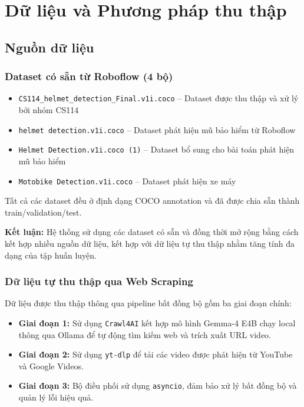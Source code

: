 \section{Dữ liệu và Phương pháp thu thập}
\subsection{Nguồn dữ liệu}
\subsubsection{Dataset có sẵn từ Roboflow (4 bộ)}

\begin{itemize}
    \item \texttt{CS114\_helmet\_detection\_Final.v1i.coco} – Dataset được thu thập và xử lý bởi nhóm CS114
    \item \texttt{helmet detection.v1i.coco} – Dataset phát hiện mũ bảo hiểm từ Roboflow
    \item \texttt{Helmet Detection.v1i.coco (1)} – Dataset bổ sung cho bài toán phát hiện mũ bảo hiểm
    \item \texttt{Motobike Detection.v1i.coco} – Dataset phát hiện xe máy
\end{itemize}

Tất cả các dataset đều ở định dạng COCO annotation và đã được chia sẵn thành train/validation/test.

\textbf{Kết luận:} Hệ thống sử dụng các dataset có sẵn và đồng thời mở rộng bằng cách kết hợp nhiều nguồn dữ liệu, kết hợp với dữ liệu tự thu thập nhằm tăng tính đa dạng của tập huấn luyện.

\subsubsection{Dữ liệu tự thu thập qua Web Scraping}

Dữ liệu được thu thập thông qua pipeline bất đồng bộ gồm ba giai đoạn chính:

\begin{itemize}
    \item \textbf{Giai đoạn 1:} Sử dụng \texttt{Crawl4AI} \cite{crawl4ai2024} kết hợp mô hình Gemma-4 E4B chạy local thông qua Ollama để tự động tìm kiếm web và trích xuất URL video.
    
    \item \textbf{Giai đoạn 2:} Sử dụng \texttt{yt-dlp} để tải các video được phát hiện từ YouTube và Google Videos.
    
    \item \textbf{Giai đoạn 3:} Bộ điều phối sử dụng \texttt{asyncio}, đảm bảo xử lý bất đồng bộ và quản lý lỗi hiệu quả.
\end{itemize}

